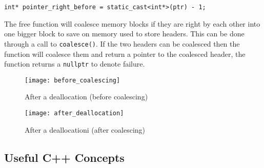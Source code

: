 \documentclass{article}
\begin{document}
\begin{lstlisting}
int* pointer_right_before = static_cast<int*>(ptr) - 1;
\end{lstlisting}

The free function will coalesce memory blocks if they are right by each other
into one bigger block to save on memory used to store headers.  This can be
done through a call to \texttt{coalesce()}.  If the two headers can be
coalesced then the function will coalesce them and return a pointer to the
coalesced header, the function returns a \texttt{nullptr} to denote failure.

\begin{figure}[!htb]
\centering
\texttt{[image: before\_coalescing]}
\caption{After a deallocation (before coalescing)}
\end{figure}

\begin{figure}[!htb]
\centering
\texttt{[image: after\_deallocation]}
\caption{After a deallocationi (after coalescing)}
\end{figure}

\newpage
\subsection{Useful C++ Concepts}
\end{document}
